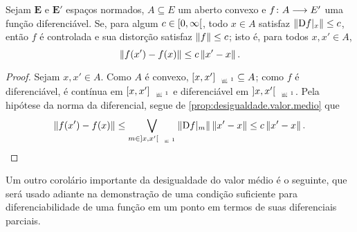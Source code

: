 \begin{proposition}
\label{prop:diferencial.limitada.funcao.controlada}
Sejam $\bm E$ e $\bm E'$ espaços normados, $A \subseteq E$ um aberto convexo e ${f}\colon {A} \longrightarrow {E'}$ uma função diferenciável. Se, para algum $c \in \left[{0},{\infty}\right[$, todo $x \in A$ satisfaz $\left\Vert{\mathrm{D}f|_x}\right\Vert \leq c$, então $f$ é controlada e sua distorção satisfaz $\left\Vert{f}\right\Vert \leq c$; isto é, para todos $x,x' \in A$,
	\begin{equation*}
	\left\Vert{f(x') - f(x)}\right\Vert \leq c \left\Vert{x'-x}\right\Vert.
	\end{equation*}
\end{proposition}
\begin{proof}
Sejam $x,x' \in A$. Como $A$ é convexo, $\Sxger{x,x'} \subseteq A$; como $f$ é diferenciável, é contínua em $\Sxger{x,x'}$ e diferenciável em $\Sxgera{x,x'}$. Pela hipótese da norma da diferencial, segue de \ref{prop:desigualdade.valor.medio} que
	\begin{equation*}
	\nor{f(x') - f(x)} \leq \sup_{m \in \Sxgera{x,x'}} \nor{\D f|_m} \nor{x'-x} \leq c\nor{x'-x}.
	\qedhere
	\end{equation*}
\end{proof}

Um outro corolário importante da desigualdade do valor médio é o seguinte, que será usado adiante na demonstração de uma condição suficiente para diferenciabilidade de uma função em um ponto em termos de suas diferenciais parciais.

